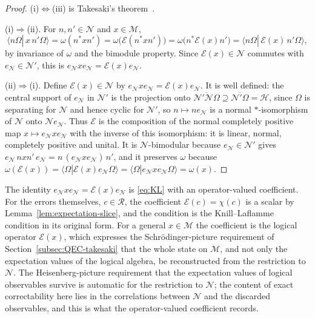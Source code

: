 \documentclass[a4paper,11pt]{article}
\theoremstyle{definition}
\newcommand{\mR}{\mathcal{R}}
\newcommand{\mN}{\mathcal{N}}
\newcommand{\mM}{\mathcal{M}}
\newcommand{\mE}{\mathcal{E}}
\begin{document}
\begin{proof}
(i)$\Leftrightarrow$(iii) is Takesaki's theorem~\cite{Takesaki1972}.

(i)$\Rightarrow$(ii). For $n,n'\in\mN$ and $x\in\mM$,
\[
 \langle n\Omega|\,x\,n'\Omega\rangle=\omega(n^*xn')=\omega\bigl(\mE(n^*xn')\bigr)=\omega\bigl(n^*\mE(x)n'\bigr)=\langle n\Omega|\,\mE(x)\,n'\Omega\rangle,
\]
by invariance of $\omega$ and the bimodule property. Since $\mE(x)\in\mN$ commutes with $e_{\mN}\in\mN'$, this is $e_{\mN}xe_{\mN}=\mE(x)e_{\mN}$.

(ii)$\Rightarrow$(i). Define $\mE(x)\in\mN$ by $e_{\mN}xe_{\mN}=\mE(x)e_{\mN}$. It is well defined: the central support of $e_{\mN}$ in $\mN'$ is the projection onto $\overline{\mN'\mN\Omega}\supseteq\overline{\mN'\Omega}=\mathcal H$, since $\Omega$ is separating for $\mN$ and hence cyclic for $\mN'$, so $n\mapsto ne_{\mN}$ is a normal $*$-isomorphism of $\mN$ onto $\mN e_{\mN}$. Thus $\mE$ is the composition of the normal completely positive map $x\mapsto e_{\mN}xe_{\mN}$ with the inverse of this isomorphism: it is linear, normal, completely positive and unital. It is $\mN$-bimodular because $e_{\mN}\in\mN'$ gives $e_{\mN}\,nxn'\,e_{\mN}=n\,(e_{\mN}xe_{\mN})\,n'$, and it preserves $\omega$ because $\omega(\mE(x))=\langle\Omega|\mE(x)e_{\mN}\Omega\rangle=\langle\Omega|e_{\mN}xe_{\mN}\Omega\rangle=\omega(x)$.
\end{proof}

The identity $e_{\mN}xe_{\mN}=\mE(x)e_{\mN}$ is \eqref{eq:KL} with an operator-valued coefficient. For the errors themselves, $c\in\mR$, the coefficient $\mE(c)=\chi(c)$ is a scalar by Lemma~\ref{lem:expectation-slice}, and the condition is the Knill--Laflamme condition in its original form. For a general $x\in\mM$ the coefficient is the logical operator $\mE(x)$, which expresses the Schr\"odinger-picture requirement of Section~\ref{subsec:QEC-takesaki} that the whole state on $\mM$, and not only the expectation values of the logical algebra, be reconstructed from the restriction to $\mN$. The Heisenberg-picture requirement that the expectation values of logical observables survive is automatic for the restriction to $\mN$; the content of exact correctability here lies in the correlations between $\mN$ and the discarded observables, and this is what the operator-valued coefficient records.
\end{document}
